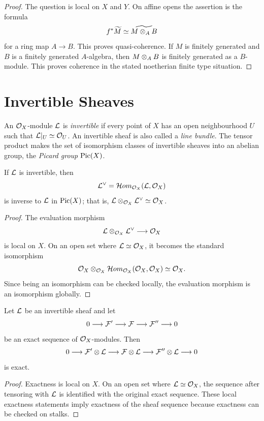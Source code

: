 \begin{proof}
The question is local on \(X\) and \(Y\).  On affine opens the assertion is the
formula
\[
    f^*\widetilde M\simeq \widetilde{M\otimes_A B}
\]
for a ring map \(A\to B\).  This proves quasi-coherence.  If \(M\) is finitely
generated and \(B\) is a finitely generated \(A\)-algebra, then
\(M\otimes_A B\) is finitely generated as a \(B\)-module.  This proves
coherence in the stated noetherian finite type situation.
\end{proof}

\section{Invertible Sheaves}

\begin{definition}
An \(\mathcal{O}_X\)-module \(\mathcal{L}\) is \emph{invertible} if every point of \(X\) has an
open neighbourhood \(U\) such that \(\mathcal{L}|_U\simeq \mathcal{O}_U\).  An invertible sheaf
is also called a \emph{line bundle}.  The tensor product makes the set of
isomorphism classes of invertible sheaves into an abelian group, the
\emph{Picard group} \(\operatorname{Pic}(X)\).
\end{definition}

\begin{proposition}
If \(\mathcal{L}\) is invertible, then
\[
    \mathcal{L}^\vee=\mathcal{H}om_{\mathcal{O}_X}(\mathcal{L},\mathcal{O}_X)
\]
is inverse to \(\mathcal{L}\) in \(\operatorname{Pic}(X)\); that is,
\(\mathcal{L}\otimes_{\mathcal{O}_X}\mathcal{L}^\vee\simeq\mathcal{O}_X\).
\end{proposition}

\begin{proof}
The evaluation morphism
\[
    \mathcal{L}\otimes_{\mathcal{O}_X}\mathcal{L}^\vee\longrightarrow\mathcal{O}_X
\]
is local on \(X\).  On an open set where \(\mathcal{L}\simeq\mathcal{O}_X\), it becomes the
standard isomorphism
\[
    \mathcal{O}_X\otimes_{\mathcal{O}_X}\mathcal{H}om_{\mathcal{O}_X}(\mathcal{O}_X,\mathcal{O}_X)\simeq\mathcal{O}_X.
\]
Since being an isomorphism can be checked locally, the evaluation morphism is
an isomorphism globally.
\end{proof}

\begin{proposition}
Let \(\mathcal{L}\) be an invertible sheaf and let
\[
    0\longrightarrow \mathcal{F}'\longrightarrow \mathcal{F}\longrightarrow \mathcal{F}''
    \longrightarrow 0
\]
be an exact sequence of \(\mathcal{O}_X\)-modules.  Then
\[
    0\longrightarrow \mathcal{F}'\otimes\mathcal{L}\longrightarrow \mathcal{F}\otimes\mathcal{L}
    \longrightarrow \mathcal{F}''\otimes\mathcal{L}\longrightarrow 0
\]
is exact.
\end{proposition}

\begin{proof}
Exactness is local on \(X\).  On an open set where \(\mathcal{L}\simeq\mathcal{O}_X\), the
sequence after tensoring with \(\mathcal{L}\) is identified with the original exact
sequence.  These local exactness statements imply exactness of the sheaf
sequence because exactness can be checked on stalks.
\end{proof}

